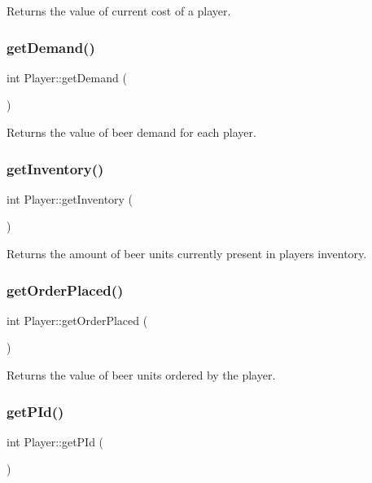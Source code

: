Returns the value of current cost of a player. \mbox{\label{classPlayer_a8bfca991628b682ff9cae6d05ee9131c}} 
\subsubsection{\texorpdfstring{get\+Demand()}{getDemand()}}
{\footnotesize\ttfamily int Player\+::get\+Demand (\begin{DoxyParamCaption}{ }\end{DoxyParamCaption})}

Returns the value of beer demand for each player. \mbox{\label{classPlayer_ae21d65a545c20c70ac7a53389b223ce6}} 
\subsubsection{\texorpdfstring{get\+Inventory()}{getInventory()}}
{\footnotesize\ttfamily int Player\+::get\+Inventory (\begin{DoxyParamCaption}{ }\end{DoxyParamCaption})}

Returns the amount of beer units currently present in player\textquotesingle{}s inventory. \mbox{\label{classPlayer_af838b44639ee94d4185917d5d2259ce2}} 
\subsubsection{\texorpdfstring{get\+Order\+Placed()}{getOrderPlaced()}}
{\footnotesize\ttfamily int Player\+::get\+Order\+Placed (\begin{DoxyParamCaption}{ }\end{DoxyParamCaption})}

Returns the value of beer units ordered by the player. \mbox{\label{classPlayer_ad815840dfa1c1261900774b5ffd886e3}} 
\subsubsection{\texorpdfstring{get\+P\+Id()}{getPId()}}
{\footnotesize\ttfamily int Player\+::get\+P\+Id (\begin{DoxyParamCaption}{ }\end{DoxyParamCaption})}

